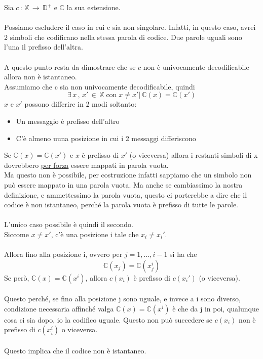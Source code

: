 \documentclass[12pt]{report}
\begin{document}
    \begin{dimo}
        Sia $c\,:\,\mathbb{X} \, \rightarrow \, \mathbb{D}^+$ e $\mathbb{C}$ la sua estensione. \\ \\
        Possiamo escludere il caso in cui c sia non singolare. Infatti, in questo caso, avrei 2 simboli che codificano nella stessa parola di codice. Due parole uguali sono l'una il prefisso dell'altra. \\ \\
        A questo punto resta da dimostrare che se $c$ non è univocamente decodificabile allora non è istantaneo. \\
        Assumiamo che c sia non univocamente decodificabile, quindi \begin{equation} \label{eq:one}
        \exists \, x \,,\,x' \, \in \, \mathbb{X}\; \text{con} \; x \neq x' | \ \mathbb{C}(x) = \mathbb{C}(x')
        \end{equation}
        $x$ e $x'$ possono differire in 2 modi soltanto:
        \begin{itemize}
            \item Un messaggio è prefisso dell'altro
            \item C'è almeno uuna posizione in cui i 2 messaggi differiscono
        \end{itemize}
        Se $\mathbb{C}(x) = \mathbb{C}(x')$ e $x$ è prefisso di $x'$ (o viceversa) allora i restanti simboli di x dovrebbero \underline{per forza} essere mappati in parola vuota. \\ Ma questo non è possibile, per costruzione infatti sappiamo che un simbolo non può essere mappato in una parola vuota. Ma anche se cambiassimo la nostra definizione, e ammettessimo la parola vuota, questo ci porterebbe a dire che il codice è non istantaneo, perché la parola vuota è prefisso di tutte le parole.
        \\ \\
        L'unico caso possibile è quindi il secondo. \\ Siccome $x \neq x'$, c'è una posizione i tale che $x_i \neq x_i'$.
        \\ \\
        Allora fino alla posizione i, ovvero per $j = 1,\dots,i-1$ si ha che
        $$\mathbb{C}(x_j) = \mathbb{C}(x_j^{i})$$
        Se però, $\mathbb{C}(x) = \mathbb{C}(x^{i})$, allora $c(x_i)$ è prefisso di $c(x_i')$ (o viceversa). \\ \\

        \noindent Questo perché, se fino alla posizione j sono uguale, e invece a i sono diverso, condizione necessaria affinché valga  $\mathbb{C}(x) = \mathbb{C}(x^{i})$ è che da j in poi, qualunque cosa ci sia dopo, io la codifico uguale. Questo non può succedere se $c(x_i)$ non è prefisso di $c(x_i^{i})$ o viceversa.
        \\ \\
        Questo implica che il codice non è istantaneo.
    \end{dimo}
\end{document}
